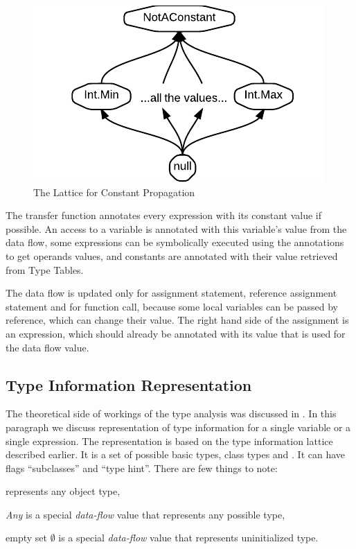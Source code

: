 \begin{figure}[h]  
  \centering
    \includegraphics{img/ConstLattice.pdf}  
    \caption{The Lattice for Constant Propagation\label{constlattice}}
\end{figure}        
        
        The transfer function annotates every expression 
        with its constant value if possible. An access to a 
        variable is annotated with this variable's value 
        from the data flow, some expressions can be symbolically 
        executed using the annotations to get operands values, 
        and constants are annotated with their value retrieved 
        from Type Tables.
        
        The data flow is updated only for assignment statement, 
        reference assignment statement and for function call, 
        because some local variables can be passed by reference, 
        which can change their value. The right hand side of 
        the assignment is an expression, which should already be 
        annotated with its value that is used for the data 
        flow value.

    \subsection{Type Information Representation}        
        The theoretical side of workings of the type analysis was 
        discussed in \wsection{} .         
        In this paragraph we discuss representation of 
        type information for a single variable or a single expression. 
        The representation is based on the type information 
        lattice described earlier. It is a set of possible 
        basic types, class types and . It can 
        have flags ``subclasses'' and ``type hint''. 
        There are few things to note:
        \begin{itemize*}
            \item {} represents any object type, 
            \item \emph{Any} is a special \emph{data-flow} value that 
                represents any possible type, 
            \item empty set $\emptyset$  is a special \emph{data-flow} value that 
                represents uninitialized type.
        \end{itemize*}
        
